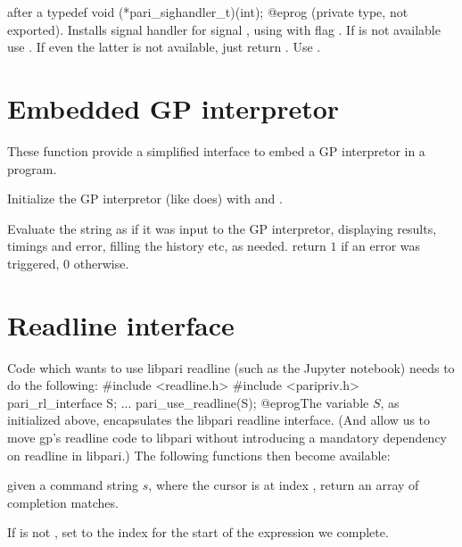  after a
\bprog
  typedef void (*pari_sighandler_t)(int);
@eprog\noindent
(private type, not exported). Installs signal handler  for
signal , using  with flag . If
 is not available use . If even the latter is not
available, just return . Use .

\section{Embedded GP interpretor}
These function provide a simplified interface to embed a GP
interpretor in a program.

Initialize the GP interpretor (like  does) with
 and .

Evaluate the string  as if it was input to the GP interpretor,
displaying results, timings and error, filling the history etc, as
needed. return $1$ if an error was triggered, $0$ otherwise.

\section{Readline interface}

Code which wants to use libpari readline (such as the Jupyter notebook)
needs to do the following:
\bprog
#include <readline.h>
#include <paripriv.h>
pari_rl_interface S;
...
pari_use_readline(S);
@eprog\noindent The variable $S$, as initialized above, encapsulates
the libpari readline interface. (And allow us to move gp's readline code
to libpari without introducing a mandatory dependency on readline in
libpari.) The following functions then become available:

 given a command string $s$, where the cursor
is at index , return an array of completion matches.

If  is not , set  to the index for the
start of the expression we complete.

